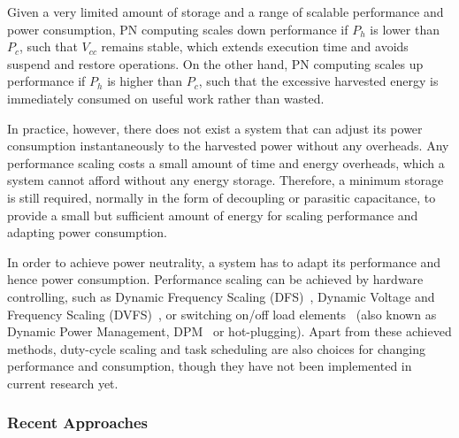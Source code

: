 Given a very limited amount of storage and a range of scalable performance and power consumption, PN computing scales down performance if $P_h$ is lower than $P_c$, such that $V_{cc}$ remains stable, which extends execution time and avoids suspend and restore operations. On the other hand, PN computing scales up performance if $P_h$ is higher than $P_c$, such that the excessive harvested energy is immediately consumed on useful work rather than wasted.

In practice, however, there does not exist a system that can adjust its power consumption instantaneously to the harvested power without any overheads. Any performance scaling costs a small amount of time and energy overheads, which a system cannot afford without any energy storage. Therefore, a minimum storage is still required, normally in the form of decoupling or parasitic capacitance, to provide a small but sufficient amount of energy for scaling performance and adapting power consumption.

In order to achieve power neutrality, a system has to adapt its performance and hence power consumption. Performance scaling can be achieved by hardware controlling, such as Dynamic Frequency Scaling (DFS)~\cite{balsamo2016graceful}, Dynamic Voltage and Frequency Scaling (DVFS)~\cite{fletcher2017power}, or switching on/off load elements~\cite{wang2016storage, fletcher2017power} (also known as Dynamic Power Management, DPM~\cite{lu2000low} or hot-plugging). Apart from these achieved methods, duty-cycle scaling and task scheduling are also choices for changing performance and consumption, though they have not been implemented in current research yet.

\subsubsection{Recent Approaches}

